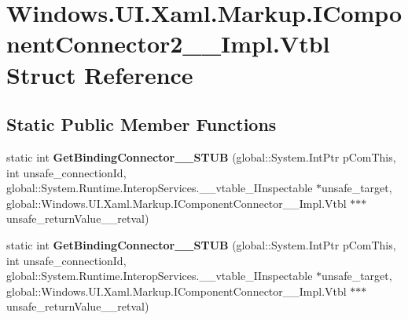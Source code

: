 \hypertarget{struct_windows_1_1_u_i_1_1_xaml_1_1_markup_1_1_i_component_connector2_____impl_1_1_vtbl}{}\section{Windows.\+U\+I.\+Xaml.\+Markup.\+I\+Component\+Connector2\+\_\+\+\_\+\+Impl.\+Vtbl Struct Reference}
\label{struct_windows_1_1_u_i_1_1_xaml_1_1_markup_1_1_i_component_connector2_____impl_1_1_vtbl}
\subsection*{Static Public Member Functions}
\begin{DoxyCompactItemize}
\item 
\mbox{\label{struct_windows_1_1_u_i_1_1_xaml_1_1_markup_1_1_i_component_connector2_____impl_1_1_vtbl_a8c4d5177a92e6e94d0ed08abe791b629}} 
static int {\bfseries Get\+Binding\+Connector\+\_\+\+\_\+\+S\+T\+UB} (global\+::\+System.\+Int\+Ptr p\+Com\+This, int unsafe\+\_\+connection\+Id, global\+::\+System.\+Runtime.\+Interop\+Services.\+\_\+\+\_\+vtable\+\_\+\+I\+Inspectable $\ast$unsafe\+\_\+target, global\+::\+Windows.\+U\+I.\+Xaml.\+Markup.\+I\+Component\+Connector\+\_\+\+\_\+\+Impl.\+Vtbl $\ast$$\ast$$\ast$unsafe\+\_\+return\+Value\+\_\+\+\_\+retval)
\item 
\mbox{\label{struct_windows_1_1_u_i_1_1_xaml_1_1_markup_1_1_i_component_connector2_____impl_1_1_vtbl_a8c4d5177a92e6e94d0ed08abe791b629}} 
static int {\bfseries Get\+Binding\+Connector\+\_\+\+\_\+\+S\+T\+UB} (global\+::\+System.\+Int\+Ptr p\+Com\+This, int unsafe\+\_\+connection\+Id, global\+::\+System.\+Runtime.\+Interop\+Services.\+\_\+\+\_\+vtable\+\_\+\+I\+Inspectable $\ast$unsafe\+\_\+target, global\+::\+Windows.\+U\+I.\+Xaml.\+Markup.\+I\+Component\+Connector\+\_\+\+\_\+\+Impl.\+Vtbl $\ast$$\ast$$\ast$unsafe\+\_\+return\+Value\+\_\+\+\_\+retval)
\item 
\mbox{\label{struct_windows_1_1_u_i_1_1_xaml_1_1_markup_1_1_i_component_connector2_____impl_1_1_vtbl_a8c4d5177a92e6e94d0ed08abe791b629}} 

\end{DoxyCompactItemize}

